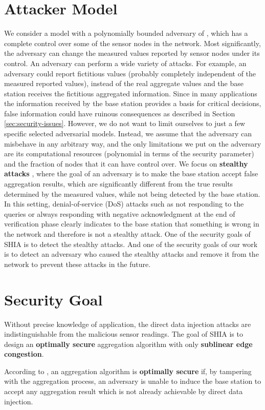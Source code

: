 \section{Attacker Model}
	
	We consider a model with a polynomially bounded adversary of \cite{przydatek2003sia}, which has a complete control over some of the sensor nodes in the network.
	Most significantly, the adversary can change the measured values reported by sensor nodes under its control.
	An adversary can perform a wide variety of attacks.
	For example, an adversary could report fictitious values (probably completely independent of the measured reported values), instead of the real aggregate values and the base station receives the fictitious aggregated information. 
	Since in many applications the information received by the base station provides a basis for critical decisions, false information could have ruinous consequences as described in Section \ref{sec:security-issues}.
	However, we do not want to limit ourselves to just a few specific selected adversarial models. 
	Instead, we assume that the adversary can misbehave in any arbitrary way, and the only limitations we put on the adversary are its computational resources (polynomial in terms of the security parameter) and the fraction of nodes that it can have control over. 
	We focus on \textbf{stealthy attacks} \cite{przydatek2003sia}, where the goal of an adversary is to make the base station accept false aggregation results, which are significantly different from the true results determined by the measured values, while not being detected by the base station.
	In this setting, denial-of-service (DoS) attacks such as not responding to the queries or always responding with negative acknowledgment at the end of verification phase clearly indicates to the base station that something is wrong in the network and therefore is not a stealthy attack.
	One of the security goals of SHIA is to detect the stealthy attacks.
	And one of the security goals of our work is to detect an adversary who caused the stealthy attacks and remove it from the network to prevent these attacks in the future.
	
\section{Security Goal}
	Without precise knowledge of application, the direct data injection attacks are indistinguishable from the malicious sensor readings.
	The goal of SHIA is to design an \textbf{optimally secure} aggregation algorithm with only \textbf{sublinear edge congestion}.
	\begin{definition}
		\label{def:optimally-secure}
		According to \cite{chan2006secure}, an aggregation algorithm is \textbf{optimally secure} if, by tampering with the aggregation process, an adversary is unable to induce the base station to accept any aggregation result which is not already achievable by direct data injection.
	\end{definition}

